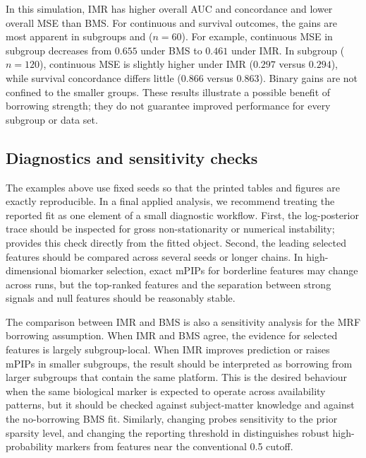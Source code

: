 \documentclass[article]{jss}
\begin{document}
\begin{sloppypar}
In this simulation, IMR has higher overall AUC and concordance and lower
overall MSE than BMS. For continuous and survival outcomes, the gains are most
apparent in subgroups  and  ($n=60$). For example, continuous
MSE in subgroup  decreases from $0.655$ under BMS to $0.461$ under
IMR. In subgroup  ($n=120$), continuous MSE is slightly higher under
IMR ($0.297$ versus $0.294$), while survival concordance differs little
($0.866$ versus $0.863$). Binary gains are not confined to the smaller groups.
These results illustrate a possible benefit of borrowing strength; they do not
guarantee improved performance for every subgroup or data set.
\end{sloppypar}

\subsection{Diagnostics and sensitivity checks}\label{sec:diagnostics}

The examples above use fixed seeds so that the printed tables and figures are
exactly reproducible.  In a final applied analysis, we recommend treating the
reported fit as one element of a small diagnostic workflow.  First, the
log-posterior trace should be inspected for gross non-stationarity or numerical
instability;  provides this check directly from
the fitted object.  Second, the leading selected features should be compared
across several seeds or longer chains.  In high-dimensional biomarker
selection, exact mPIPs for borderline features may change across runs, but the
top-ranked features and the separation between strong signals and null features
should be reasonably stable.

The comparison between IMR and BMS is also a sensitivity analysis for the MRF
borrowing assumption.  When IMR and BMS agree, the evidence for selected
features is largely subgroup-local.  When IMR improves prediction or raises
mPIPs in smaller subgroups, the result should be interpreted as borrowing from
larger subgroups that contain the same platform.  This is the desired behaviour
when the same biological marker is expected to operate across availability
patterns, but it should be checked against subject-matter knowledge and against
the no-borrowing BMS fit.  Similarly, changing  probes sensitivity to
the prior sparsity level, and changing the reporting threshold in
 distinguishes robust high-probability
markers from features near the conventional 0.5 cutoff.
\end{document}

